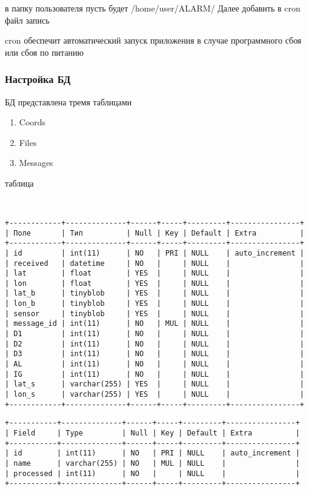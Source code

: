\documentclass[12pt]{article}[a4paper,14pt,russian]
\begin{document}
	в папку пользователя пусть будет /home/user/ALARM/
	Далее добавить в cron файл запись 

	cron обеспечит автоматический запуск приложения в случае программного сбоя или сбоя по питанию
	\subsubsection{Настройка БД}
	БД представлена тремя таблицами
	\begin{enumerate}
	\item Coords
	\item Files
	\item Messages
    \end{enumerate} 
	таблица
	\begin{verbatim}
    

+------------+--------------+------+-----+---------+----------------+
| Поле       | Тип          | Null | Key | Default | Extra          |
+------------+--------------+------+-----+---------+----------------+
| id         | int(11)      | NO   | PRI | NULL    | auto_increment |
| received   | datetime     | NO   |     | NULL    |                |
| lat        | float        | YES  |     | NULL    |                |
| lon        | float        | YES  |     | NULL    |                |
| lat_b      | tinyblob     | YES  |     | NULL    |                |
| lon_b      | tinyblob     | YES  |     | NULL    |                |
| sensor     | tinyblob     | YES  |     | NULL    |                |
| message_id | int(11)      | NO   | MUL | NULL    |                |
| D1         | int(11)      | NO   |     | NULL    |                |
| D2         | int(11)      | NO   |     | NULL    |                |
| D3         | int(11)      | NO   |     | NULL    |                |
| AL         | int(11)      | NO   |     | NULL    |                |
| IG         | int(11)      | NO   |     | NULL    |                |
| lat_s      | varchar(255) | YES  |     | NULL    |                |
| lon_s      | varchar(255) | YES  |     | NULL    |                |
+------------+--------------+------+-----+---------+----------------+
\end{verbatim}
\begin{verbatim}
+-----------+--------------+------+-----+---------+----------------+
| Field     | Type         | Null | Key | Default | Extra          |
+-----------+--------------+------+-----+---------+----------------+
| id        | int(11)      | NO   | PRI | NULL    | auto_increment |
| name      | varchar(255) | NO   | MUL | NULL    |                |
| processed | int(11)      | NO   |     | NULL    |                |
+-----------+--------------+------+-----+---------+----------------+
\end{verbatim}
\end{document}

